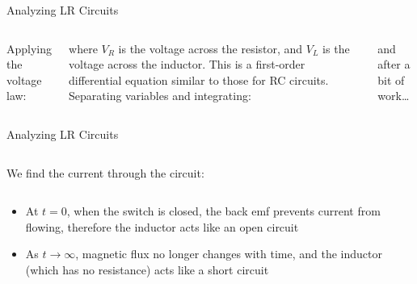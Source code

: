 \documentclass[12pt,aspectratio=169]{beamer}
\begin{document}
\begin{frame}{Analyzing LR Circuits}
  \begin{columns}

    Applying the voltage law:


    \vspace{-.1in}where $V_R$ is the voltage across the resistor, and $V_L$ is
    the voltage across the inductor. This is a first-order differential
    equation similar to those for RC circuits. Separating variables and
    integrating:

    
    and after a bit of work\ldots
  \end{columns}
\end{frame}



\begin{frame}{Analyzing LR Circuits}
  \begin{columns}

    We find the current through the circuit:

  \end{columns}
  \vspace{.2in}
  \begin{itemize}
  \item At $t=0$, when the switch is closed, the back emf prevents current from
    flowing, therefore the inductor acts like an open circuit
  \item As $t\rightarrow\infty$, magnetic flux no longer changes with time, and
    the inductor (which has no resistance) acts like a short circuit
  \end{itemize}
\end{frame}
\end{document}
